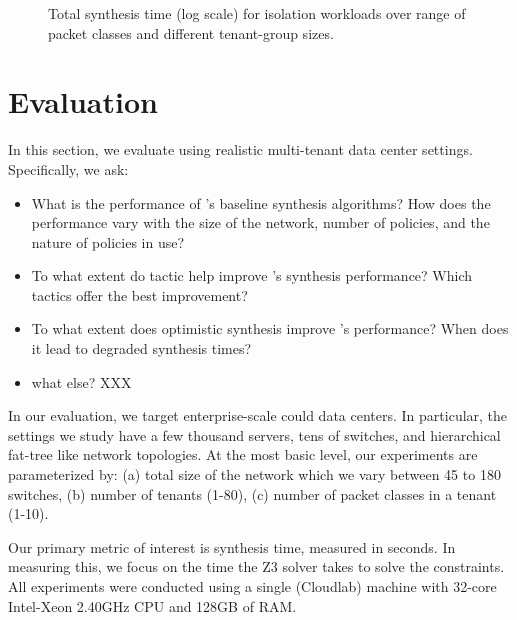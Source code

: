 \begin{figure*}[width=2\columnwidth]
	\centering
	\caption{\label{fig:isolation}
		Total synthesis time (log scale) for isolation workloads over range of packet classes and different tenant-group sizes.}
\end{figure*}

\section{Evaluation}
In this section, we evaluate \Name using realistic multi-tenant data
center settings. Specifically, we ask:

\begin{itemize}

\item What is the performance of \Name's baseline synthesis
  algorithms? How does the performance vary with the size of the
  network, number of policies, and the nature of policies in use?

\item To what extent do tactic help improve \Name's synthesis
  performance? Which tactics offer the best improvement?

\item To what extent does optimistic synthesis improve \Name's
  performance? When does it lead to degraded synthesis times?

\item what else? XXX

\end{itemize}

In our evaluation, we target enterprise-scale could data centers. In
particular, the settings we study have a few thousand servers, tens of
switches, and hierarchical fat-tree like network topologies. At the
most basic level, our experiments are parameterized by: (a) total size
of the network which we vary between 45 to 180 switches, (b) number of
tenants (1-80), (c) number of packet classes in a tenant (1-10). 

Our primary metric of interest is synthesis time, measured in
seconds. In measuring this, we focus on the time the Z3 solver takes
to solve the constraints. All experiments were conducted using a
single (Cloudlab) machine with 32-core Intel-Xeon 2.40GHz CPU and
128GB of RAM.

